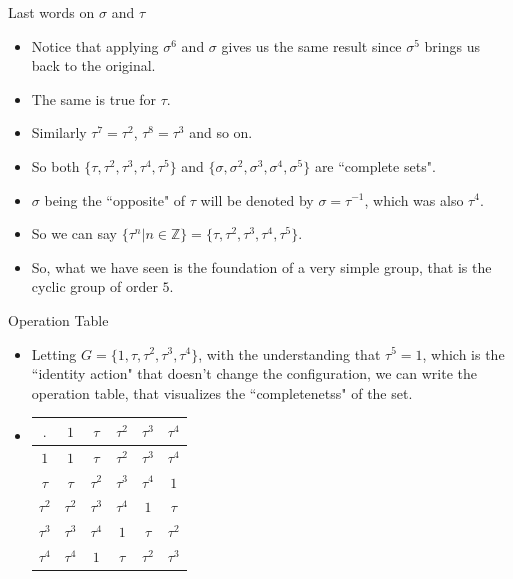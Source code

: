\documentclass[ %
 10pt, xcolor={dvipsnames,svgnames,x11names,hyperref},
   hyperref={colorlinks=true,citecolor=green,linkcolor=DarkRed,urlcolor=ProcessBlue,anchorcolor=blue}
  ]{beamer}
\newenvironment{stepitemize}{\begin{itemize}[<+->]}{\end{itemize} }
\newcommand{\Z}{\mathbb{Z}}
\begin{document}
\begin{frame}{Last words on $\sigma$ and $\tau$}

\begin{stepitemize}
\item Notice that applying $\sigma^6$ and $\sigma$ gives us the same result since $\sigma^5$ brings us back to the original.
\item The same is true for $\tau$.
\item Similarly $\tau^7=\tau^2$, $\tau^8=\tau^3$ and so on.
\item So both $\{\tau, \tau^2, \tau^3, \tau^4, \tau^5\}$ and
$\{\sigma, \sigma^2, \sigma^3, \sigma^4, \sigma^5\}$ are ``complete sets".
\item $\sigma$ being the ``opposite" of $\tau$ will be denoted by $\sigma=\tau^{-1}$, which was also $\tau^4$.
\item So we can say $\{\tau^n|n\in \Z\} = \{\tau, \tau^2, \tau^3, \tau^4, \tau^5\}$.
\item So, what we have seen is the foundation of a very simple group, that is the cyclic group of order $5$.
\end{stepitemize}
\end{frame}
\begin{frame}{Operation Table}
\begin{stepitemize}
\item Letting $G = \{1, \tau, \tau^2, \tau^3, \tau^4\}$, with the understanding that $\tau^5=1$, which is the ``identity action" that doesn't change the configuration, we can write the operation table, that visualizes the ``completenetss" of the set.

\bigskip

\item[]
\begin{table}[H]
\begin{tabular}{ c| c | c |c|c|c}
$.$  & $1$ & $\tau$ & $\tau^2$ & $\tau^3$ & $\tau^4$ \\
\hline
$1$ & $1$ & $\tau$ & $\tau^2$ & $\tau^3$ & $\tau^4$ \\
\hline
$\tau$ & $\tau$ & $\tau^2$ & $\tau^3$ & $\tau^4$ & $1$ \\
\hline
$\tau^2$ & $\tau^2$ & $\tau^3$ & $\tau^4$ & $1$ & $\tau$ \\
\hline
$\tau^3$ & $\tau^3$& $\tau^4$ & $1$&$\tau$& $\tau^2$\\
\hline
$\tau^4$ & $\tau^4$& $1$ & $\tau$&$\tau^2$& $\tau^3$\\
\end{tabular}
\end{table}
\end{stepitemize}

\end{frame}
\end{document}

